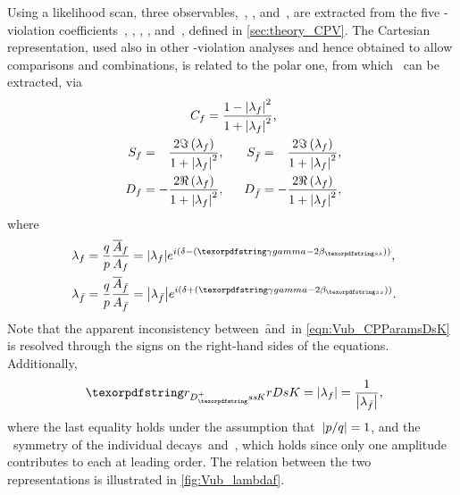 Using a likelihood scan, three observables,~\weak, \strongangle, and~\rdsk, are extracted from the five \CP-violation coefficients~\Cpar, \Spar, \Sbpar, \Dpar, and~\Dbpar, defined in \cref{sec:theory_CPV}.
The Cartesian representation, used also in other \CP-violation analyses and hence obtained to allow comparisons and combinations, is related to the polar one, from which \CPgamma~can be extracted, via
%
\begin{gather}
    \Cpar  = \dfrac{1 - \abs{\lf}^{2}}{1 + \abs{\lf}^{2}} \rlap{,} \nonumber \\
    \begin{aligned}
         \Spar  &= \n\dfrac{2 \Im\left(\lf\right)}{1 + \abs{\lf}^{2}} \rlap{,} \quad
        &\Sbpar &= \n\dfrac{2 \Im\left(\lf\right)}{1 + \abs{\lf}^{2}} \rlap{,} \label{eqn:Vub_CPParamsDsK} \\
         \Dpar  &=  -\dfrac{2 \Re\left(\lf\right)}{1 + \abs{\lf}^{2}} \rlap{,}
        &\Dbpar &=  -\dfrac{2 \Re\left(\lf\right)}{1 + \abs{\lf}^{2}} \rlap{,}
    \end{aligned}
\end{gather}
%
where
%
\begin{subequations} \label{eqn:Vub_lambdaf}
    \begin{align}
        \lf  &= \dfrac{q}{p} \dfrac{\Abf}{\Af}   = \abs{\lf}  e^{i\left(\strongangle - (\weak)\right)} \rlap{,} \\
        \lfb &= \dfrac{q}{p} \dfrac{\Abfb}{\Afb} = \abs{\lfb} e^{i\left(\strongangle + (\weak)\right)} \rlap{.}
    \end{align}
\end{subequations}
%
Note that the apparent inconsistency between~\f and~\fb in \cref{eqn:Vub_CPParamsDsK} is resolved through the signs on the right-hand sides of the equations.
Additionally,
%
\begin{equation*}
    \rdsk = \abs{\lf} = \dfrac{1}{\abs{\lfb}} \rlap{,}
\end{equation*}
%
where the last equality holds under the assumption that~\({{\left|p/q\right|} = 1}\), and the \CP~symmetry of the individual decays~\BsDsmKp and~\BsDspKm, which holds since only one amplitude contributes to each at leading order.
The relation between the two representations is illustrated in \cref{fig:Vub_lambdaf}.

